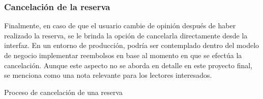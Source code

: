 
\subsubsection{Cancelación de la reserva}

Finalmente, en caso de que el usuario cambie de opinión después de haber realizado la reserva, se le brinda la opción de cancelarla directamente desde la interfaz. En un entorno de producción, podría ser contemplado dentro del modelo de negocio implementar reembolsos en base al momento en que se efectúa la cancelación. Aunque este aspecto no se aborda en detalle en este proyecto final, se menciona como una nota relevante para los lectores interesados.

\begin{images}[\label{cancelacion_reserva}]{Proceso de cancelación de una reserva}
\end{images}
